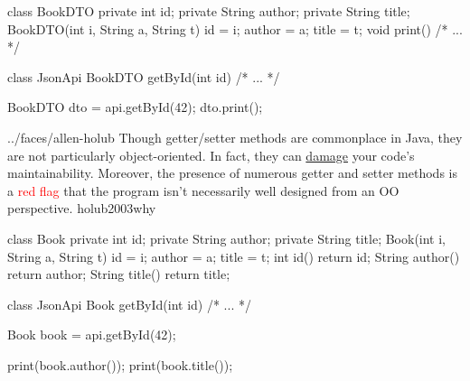 \documentclass{article}
\begin{document}
\begin{lnSnippet}
class BookDTO {
  private int id;
  private String author;
  private String title;
  BookDTO(int i, String a, String t)
    { id = i; author = a; title = t; }
  void print() { /* ... */ }
}
\end{lnSnippet}
\begin{lnSnippet}
class JsonApi {
  BookDTO getById(int id) { /* ... */ }
}

BookDTO dto = api.getById(42);
dto.print();
\end{lnSnippet}

\lnQuote
  {../faces/allen-holub}
  {Though getter/setter methods are commonplace in Java, they are not particularly object-oriented. In fact, they can \ul{damage} your code's maintainability. Moreover, the presence of numerous getter and setter methods is a \textcolor{red}{red flag} that the program isn't necessarily well designed from an OO perspective.}
  {holub2003why}

\begin{lnSnippet}
class Book {
  private int id;
  private String author;
  private String title;
  Book(int i, String a, String t)
    { id = i; author = a; title = t; }
  int id() { return id; }
  String author() { return author; }
  String title() { return title; }
}
\end{lnSnippet}
\begin{lnSnippet}
class JsonApi {
  Book getById(int id) { /* ... */ }
}

Book book = api.getById(42);

print(book.author());
print(book.title());
\end{lnSnippet}
\end{document}
